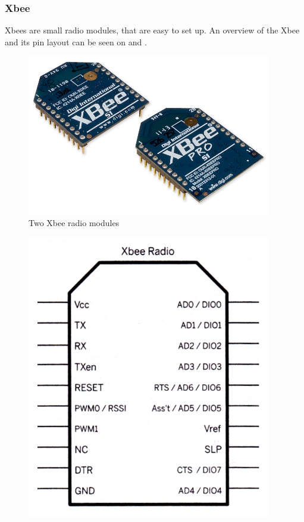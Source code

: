 \subsubsection{Xbee}
Xbees are small radio modules, that are easy to set up. An overview of the Xbee and its pin layout can be seen on  and .


\begin{minipage}{\linewidth}
	\centering
	\begin{minipage}{0.45\linewidth}      
		\begin{figure}[H]
			\centering
			\includegraphics[width=0.95\textwidth]{figures/Xbee.jpg}
			\caption{Two Xbee radio modules} 
			\label{XbeeLook}
		\end{figure}
	\end{minipage}
	\hspace{0.03\linewidth}
	\begin{minipage}{0.45\linewidth}
		\begin{figure}[H]
			\centering
			\includegraphics[width=0.95\textwidth]{figures/XbeeIO.jpg}

\end{figure}
\end{minipage}
\end{minipage}
